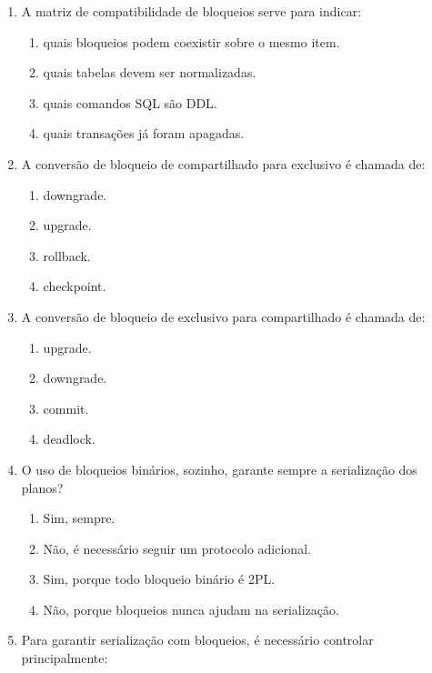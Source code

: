 \documentclass[12pt,a4paper]{article}
\begin{document}
\begin{enumerate}[label=\textbf{Q\arabic*.}]
\item A matriz de compatibilidade de bloqueios serve para indicar:

\begin{enumerate}[label=\alph*)]
    \item quais bloqueios podem coexistir sobre o mesmo item.
    \item quais tabelas devem ser normalizadas.
    \item quais comandos SQL são DDL.
    \item quais transações já foram apagadas.
\end{enumerate}

\item A conversão de bloqueio de compartilhado para exclusivo é chamada de:

\begin{enumerate}[label=\alph*)]
    \item downgrade.
    \item upgrade.
    \item rollback.
    \item checkpoint.
\end{enumerate}

\item A conversão de bloqueio de exclusivo para compartilhado é chamada de:

\begin{enumerate}[label=\alph*)]
    \item upgrade.
    \item downgrade.
    \item commit.
    \item deadlock.
\end{enumerate}

\item O uso de bloqueios binários, sozinho, garante sempre a serialização dos planos?

\begin{enumerate}[label=\alph*)]
    \item Sim, sempre.
    \item Não, é necessário seguir um protocolo adicional.
    \item Sim, porque todo bloqueio binário é 2PL.
    \item Não, porque bloqueios nunca ajudam na serialização.
\end{enumerate}

\item Para garantir serialização com bloqueios, é necessário controlar principalmente:


\end{enumerate}
\end{document}
